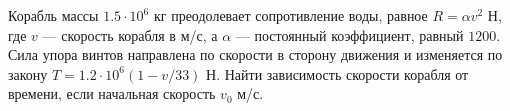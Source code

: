Корабль массы $1.5\cdot 10^6$ кг преодолевает сопротивление
воды, равное $R=\alpha v^2$ Н, где $v$ --- скорость корабля в м/с,
а $\alpha$ --- постоянный коэффициент, равный $1200$. Сила упора
винтов направлена по скорости в сторону движения и изменяется
по закону $T=1.2\cdot 10^6\left(1-v/33\right)$ Н. Найти зависимость
скорости корабля от времени, если начальная скорость $v_{0}$ м/с.
